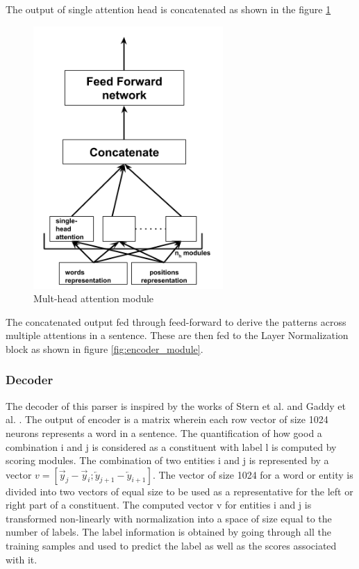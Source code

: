 \documentclass[a4paper, 11pt]{article}
\begin{document}
The output of single attention head is concatenated as shown in the figure \ref{fig:multi_head_attention_module}
\begin{figure}[htpb]
    \centering
    \includegraphics[width=\textwidth,height=10cm,keepaspectratio=true]
    {multi-head-attention.png}
    \caption{
        Mult-head attention module
    }
    \label{fig:multi_head_attention_module}
\end{figure}

The concatenated output fed through feed-forward to derive the patterns across multiple attentions in a sentence. These are then fed to the Layer Normalization block as shown in figure \ref{fig:encoder_module}.

\subsubsection{Decoder}
The decoder of this parser is inspired by the works of Stern et al. \parencite{Stern2017} and Gaddy et al. \parencite{Gaddy2018}. The output of encoder is a matrix wherein each row vector of size 1024 neurons represents a word in a sentence. The quantification of how good a combination i and j is considered as a constituent with label l is computed by scoring modules. The combination of two entities i and j is represented by a vector  $v = [\overrightarrow{y}_j - \overrightarrow{y}_i; \overleftarrow{y}_{j+1} - \overleftarrow{y}_{i+1}]$. The vector of size 1024 for a word or entity is divided into two vectors of equal size to be used as a representative for the left or right part of a constituent. The computed vector v for entities i and j  is transformed non-linearly with normalization into a space of size equal to the number of labels. The label information is obtained by going through all the training samples and used to predict the label as well as the scores associated with it. 
\end{document}

